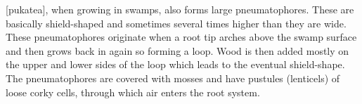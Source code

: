 [pukatea], when growing in swamps, also forms large pneumatophores.
These are basically shield-shaped and sometimes several times higher than they are wide.
These pneumatophores originate when a root tip arches above the swamp surface and then grows back in again so forming a loop.
Wood is then added mostly on the upper and lower sides of the loop which leads to the eventual shield-shape.
The pneumatophores are covered with mosses and have pustules (lenticels) of loose corky cells, through which air enters the root system.

\begin{figure}[t]
	\begin{minipage}[t]{\textwidth}
		\begin{minipage}[t]{(\textwidth-\fgap-\fgap) * \real{0.243}}

\end{minipage}
\end{minipage}
\end{figure}
